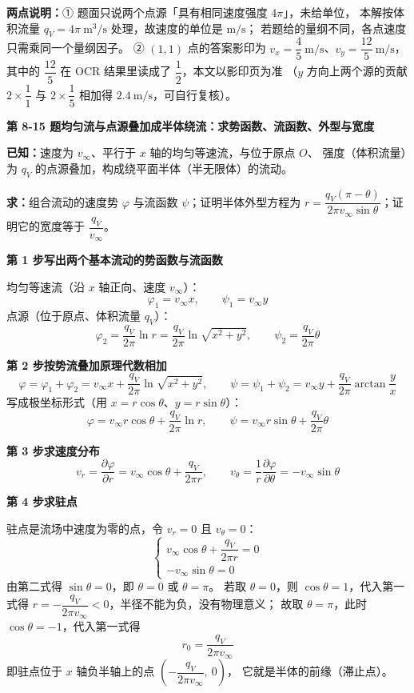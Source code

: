 \begin{tishi}
\textbf{两点说明：}① 题面只说两个点源「具有相同速度强度 $4\pi$」，未给单位，
本解按体积流量 $q_V=4\pi\ \mathrm{m^3/s}$ 处理，故速度的单位是 $\mathrm{m/s}$；
若题给的量纲不同，各点速度只需乘同一个量纲因子。
② $(1,1)$ 点的答案影印为 $v_x=\dfrac{4}{5}\ \mathrm{m/s}$、$v_y=\dfrac{12}{5}\ \mathrm{m/s}$，
其中的 $\dfrac{12}{5}$ 在 OCR 结果里读成了 $\dfrac{1}{2}$，本文以影印页为准
（$y$ 方向上两个源的贡献 $2\times\dfrac{1}{1}$ 与 $2\times\dfrac{1}{5}$ 相加得 $2.4\ \mathrm{m/s}$，可自行复核）。
\end{tishi}

\noindent\textbf{第 8-15 题\quad 均匀流与点源叠加成半体绕流：求势函数、流函数、外型与宽度}

\begin{jie}
\textbf{已知：}速度为 $v_\infty$、平行于 $x$ 轴的均匀等速流，与位于原点 $O$、
强度（体积流量）为 $q_V$ 的点源叠加，构成绕平面半体（半无限体）的流动。

\textbf{求：}组合流动的速度势 $\varphi$ 与流函数 $\psi$；证明半体外型方程为
$r=\dfrac{q_V(\pi-\theta)}{2\pi v_\infty\sin\theta}$；证明它的宽度等于 $\dfrac{q_V}{v_\infty}$。

\textbf{第 1 步\quad 写出两个基本流动的势函数与流函数}

均匀等速流（沿 $x$ 轴正向、速度 $v_\infty$）：
\[ \varphi_1=v_\infty x,\qquad \psi_1=v_\infty y \]
点源（位于原点、体积流量 $q_V$）：
\[ \varphi_2=\frac{q_V}{2\pi}\ln r=\frac{q_V}{2\pi}\ln\sqrt{x^2+y^2},\qquad
   \psi_2=\frac{q_V}{2\pi}\theta \]

\textbf{第 2 步\quad 按势流叠加原理代数相加}
\[ \varphi=\varphi_1+\varphi_2=v_\infty x+\frac{q_V}{2\pi}\ln\sqrt{x^2+y^2},\qquad
   \psi=\psi_1+\psi_2=v_\infty y+\frac{q_V}{2\pi}\arctan\frac{y}{x} \]
写成极坐标形式（用 $x=r\cos\theta$、$y=r\sin\theta$）：
\[ \varphi=v_\infty r\cos\theta+\frac{q_V}{2\pi}\ln r,\qquad
   \psi=v_\infty r\sin\theta+\frac{q_V}{2\pi}\theta \]

\textbf{第 3 步\quad 求速度分布}
\[ v_r=\frac{\partial\varphi}{\partial r}=v_\infty\cos\theta+\frac{q_V}{2\pi r},\qquad
   v_\theta=\frac{1}{r}\frac{\partial\varphi}{\partial\theta}=-v_\infty\sin\theta \]

\textbf{第 4 步\quad 求驻点}

驻点是流场中速度为零的点，令 $v_r=0$ 且 $v_\theta=0$：
\[ \left\{\begin{array}{l}
   v_\infty\cos\theta+\dfrac{q_V}{2\pi r}=0\\[6pt]
   -v_\infty\sin\theta=0
   \end{array}\right. \]
由第二式得 $\sin\theta=0$，即 $\theta=0$ 或 $\theta=\pi$。
若取 $\theta=0$，则 $\cos\theta=1$，代入第一式得
$r=-\dfrac{q_V}{2\pi v_\infty}<0$，半径不能为负，没有物理意义；
故取 $\theta=\pi$，此时 $\cos\theta=-1$，代入第一式得
\[ r_0=\frac{q_V}{2\pi v_\infty} \]
即驻点位于 $x$ 轴负半轴上的点 $\left(-\dfrac{q_V}{2\pi v_\infty},\ 0\right)$，
它就是半体的前缘（滞止点）。


\end{jie}
